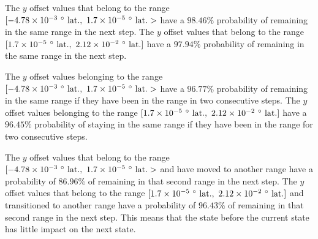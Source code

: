 \documentclass[preprint,12pt]{elsarticle}
\begin{document}
The $y$ offset values that belong to the range $[-4.78 \times 10^{-3} \ \degree \ \mathrm{lat.}, \ 1.7 \times 10^{-5} \ \degree \ \mathrm{lat.}>$ have a $98.46\%$ probability of remaining in the same range in the next step. The $y$ offset values that belong to the range $[1.7 \times 10^{-5} \ \degree \ \mathrm{lat.}, \ 2.12 \times 10^{-2} \ \degree \ \mathrm{lat.}]$ have a $97.94\%$ probability of remaining in the same range in the next step. 

The $y$ offset values belonging to the range $[-4.78 \times 10^{-3} \ \degree \ \mathrm{lat.}, \ 1.7 \times 10^{-5} \ \degree \ \mathrm{lat.}>$ have a $96.77\%$ probability of remaining in the same range if they have been in the range in two consecutive steps. The $y$ offset values belonging to the range $[1.7 \times 10^{-5} \ \degree \ \mathrm{lat.}, \ 2.12 \times 10^{-2} \ \degree \ \mathrm{lat.}]$ have a $96.45\%$ probability of staying in the same range if they have been in the range for two consecutive steps.

The $y$ offset values that belong to the range $[-4.78 \times 10^{-3} \ \degree \ \mathrm{lat.}, \ 1.7 \times 10^{-5} \ \degree \ \mathrm{lat.}>$ and have moved to another range have a probability of $86.96\%$ of remaining in that second range in the next step. The $y$ offset values that belong to the range $[1.7 \times 10^{-5} \ \degree \ \mathrm{lat.}, \  2.12 \times 10^{-2} \ \degree \ \mathrm{lat.}]$ and transitioned to another range have a probability of $96.43\%$ of remaining in that second range in the next step. This means that the state before the current state has little impact on the next state.
\end{document}

